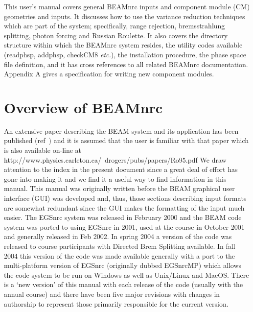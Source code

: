 \documentclass[12pt,twoside]{article}
\newcommand{\etc}{{\em etc.}}
\begin{document}
This user's manual covers general BEAMnrc inputs and component module (CM)
geometries and inputs. It discusses how to use the variance reduction techniques
which are part of the system; specifically, range rejection, bremsstrahlung
splitting, photon forcing and Russian Roulette. It also covers the directory
structure within which the BEAMnrc system resides, the utility codes available
(readphsp, addphsp, checkCM8 \etc), the installation procedure, the phase space
file definition, and it
has cross references to all related BEAMnrc documentation.
Appendix A gives a specification for writing new component
modules.
\vspace*{4cm}\\

\tableofcontents

\listoffigures

\setlength{\baselineskip}{0.5cm}

\newpage


\section{Overview of BEAMnrc}

An extensive paper describing the BEAM system and its application has
been published (ref~\cite{Ro95}) and it is assumed that the user is
familiar with that paper which is also available on-line at
{http://www.physics.carleton.ca/~drogers/pubs/papers/Ro95.pdf}
We draw attention to the index in the present document
since a great deal of effort has gone
into making it and we find it a useful way to find information in this
manual.  This manual was originally written before the BEAM graphical
user interface (GUI) was developed\cite{Tr04} and, thus, those sections
describing input formats are somewhat redundant since the GUI makes the
formatting of the input much easier. The EGSnrc
system\cite{Ka99a,KR03,Ro00} was released in February 2000 and the BEAM
code system was ported to using EGSnrc in 2001, used at the course in
October 2001 and generally released in Feb 2002. In spring 2004 a version
of the code was released to course participants with Directed Brem
Splitting available. In fall 2004 this version of the code was made
available generally with a port to the multi-platform version of EGSnrc
(originally dubbed EGSnrcMP) which allows the code system to be run on Windows
as well as Unix/Linux and MacOS. There is a `new version'
of this manual with each release of the code (usually with the annual
course) and there have been five major
revisions\cite{Ro95b,Ro97,Ro98a,Ro01b,Ro04} with changes in authorship to
represent those primarily responsible for the current version.
 
\end{document}
